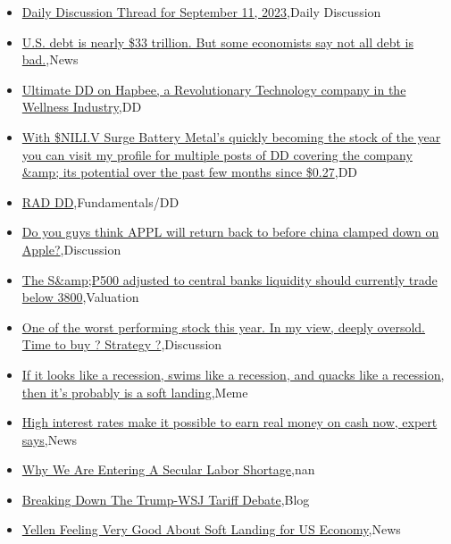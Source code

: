 \documentclass{article}%
\begin{document}
%
\begin{itemize}%
\item%
\href{https://reddit.com/r/wallstreetbets/comments/16frcdh/daily\_discussion\_thread\_for\_september\_11\_2023/}{Daily Discussion Thread for September 11, 2023},Daily Discussion%
\item%
\href{https://reddit.com/r/wallstreetbets/comments/16fqv6t/us\_debt\_is\_nearly\_33\_trillion\_but\_some\_economists/}{U.S. debt is nearly \$33 trillion. But some economists say not all debt is bad.},News%
\item%
\href{https://reddit.com/r/Baystreetbets/comments/16ebd32/ultimate\_dd\_on\_hapbee\_a\_revolutionary\_technology/}{Ultimate DD on Hapbee, a Revolutionary Technology company in the Wellness Industry},DD%
\item%
\href{https://reddit.com/r/Baystreetbets/comments/16e7p2b/with\_niliv\_surge\_battery\_metals\_quickly\_becoming/}{With \$NILI.V Surge Battery Metal's quickly becoming the stock of the year you can visit my profile for multiple posts of DD covering the company \&amp; its potential over the past few months since \$0.27},DD%
\item%
\href{https://reddit.com/r/StockMarket/comments/16fonhh/rad\_dd/}{RAD DD},Fundamentals/DD%
\item%
\href{https://reddit.com/r/StockMarket/comments/16fk584/do\_you\_guys\_think\_appl\_will\_return\_back\_to\_before/}{Do you guys think APPL will return back to before china clamped down on Apple?},Discussion%
\item%
\href{https://reddit.com/r/StockMarket/comments/16fe5oo/the\_sp500\_adjusted\_to\_central\_banks\_liquidity/}{The S\&amp;P500 adjusted to central banks liquidity should currently trade below 3800},Valuation%
\item%
\href{https://reddit.com/r/StockMarket/comments/16f5fbe/one\_of\_the\_worst\_performing\_stock\_this\_year\_in\_my/}{One of the worst performing stock this year. In my view, deeply oversold. Time to buy ? Strategy ?},Discussion%
\item%
\href{https://reddit.com/r/StockMarket/comments/16edyh8/if\_it\_looks\_like\_a\_recession\_swims\_like\_a/}{If it looks like a recession, swims like a recession, and quacks like a recession, then it's probably is a soft landing},Meme%
\item%
\href{https://reddit.com/r/Economics/comments/16fq36b/high\_interest\_rates\_make\_it\_possible\_to\_earn\_real/}{High interest rates make it possible to earn real money on cash now, expert says},News%
\item%
\href{https://reddit.com/r/Economics/comments/16fmqnp/why\_we\_are\_entering\_a\_secular\_labor\_shortage/}{Why We Are Entering A Secular Labor Shortage},nan%
\item%
\href{https://reddit.com/r/Economics/comments/16ffqe6/breaking\_down\_the\_trumpwsj\_tariff\_debate/}{Breaking Down The Trump-WSJ Tariff Debate},Blog%
\item%
\href{https://reddit.com/r/Economics/comments/16fenwt/yellen\_feeling\_very\_good\_about\_soft\_landing\_for/}{Yellen Feeling Very Good About Soft Landing for US Economy},News%
\end{itemize}%
\end{document}
